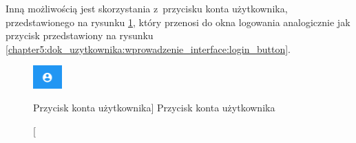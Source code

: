 \documentclass[../Kamil_Kowalewski_Main.tex]{subfiles}
\begin{document}
{{        Inną możliwością jest skorzystania z~przycisku konta użytkownika,
        przedstawionego na rysunku
        \ref{chapter5:dok_uzytkownika:wprowadzenie_interface:account_button},
        który przenosi do okna logowania analogicznie jak przycisk przedstawiony na
        rysunku \ref{chapter5:dok_uzytkownika:wprowadzenie_interface:login_button}.
        \begin{figure}[H]
            \centering
            \includegraphics[width=0.1\textwidth, keepaspectratio]
            {img/chapter5/intro/account_button.png}
            \caption
            [Przycisk konta użytkownika]
            {Przycisk konta użytkownika}
            \label{chapter5:dok_uzytkownika:wprowadzenie_interface:account_button}
        \end{figure}
    }

}
\end{document}
